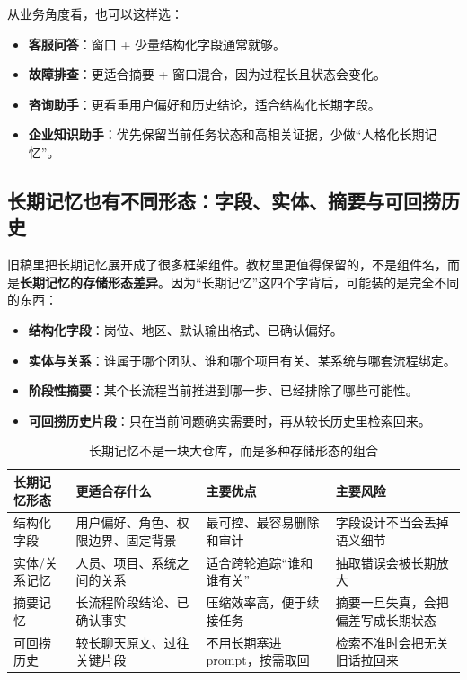 从业务角度看，也可以这样选：
\begin{itemize}
  \item \textbf{客服问答}：窗口 + 少量结构化字段通常就够。
  \item \textbf{故障排查}：更适合摘要 + 窗口混合，因为过程长且状态会变化。
  \item \textbf{咨询助手}：更看重用户偏好和历史结论，适合结构化长期字段。
  \item \textbf{企业知识助手}：优先保留当前任务状态和高相关证据，少做“人格化长期记忆”。
\end{itemize}

\subsection{长期记忆也有不同形态：字段、实体、摘要与可回捞历史}
旧稿里把长期记忆展开成了很多框架组件。教材里更值得保留的，不是组件名，而是\textbf{长期记忆的存储形态差异}。因为“长期记忆”这四个字背后，可能装的是完全不同的东西：
\begin{itemize}
  \item \textbf{结构化字段}：岗位、地区、默认输出格式、已确认偏好。
  \item \textbf{实体与关系}：谁属于哪个团队、谁和哪个项目有关、某系统与哪套流程绑定。
  \item \textbf{阶段性摘要}：某个长流程当前推进到哪一步、已经排除了哪些可能性。
  \item \textbf{可回捞历史片段}：只在当前问题确实需要时，再从较长历史里检索回来。
\end{itemize}

\begin{table}[H]
\centering
\small
\begin{tabularx}{\textwidth}{>{\raggedright\arraybackslash}p{2.8cm}>{\raggedright\arraybackslash}p{3cm}>{\raggedright\arraybackslash}p{3cm}>{\raggedright\arraybackslash}X}
\toprule
\textbf{长期记忆形态} & \textbf{更适合存什么} & \textbf{主要优点} & \textbf{主要风险} \\
\midrule
结构化字段 & 用户偏好、角色、权限边界、固定背景 & 最可控、最容易删除和审计 & 字段设计不当会丢掉语义细节 \\
实体/关系记忆 & 人员、项目、系统之间的关系 & 适合跨轮追踪“谁和谁有关” & 抽取错误会被长期放大 \\
摘要记忆 & 长流程阶段结论、已确认事实 & 压缩效率高，便于续接任务 & 摘要一旦失真，会把偏差写成长期状态 \\
可回捞历史 & 较长聊天原文、过往关键片段 & 不用长期塞进 prompt，按需取回 & 检索不准时会把无关旧话拉回来 \\
\bottomrule
\end{tabularx}
\caption{长期记忆不是一块大仓库，而是多种存储形态的组合}
\label{tab:long-term-memory-forms}
\end{table}

